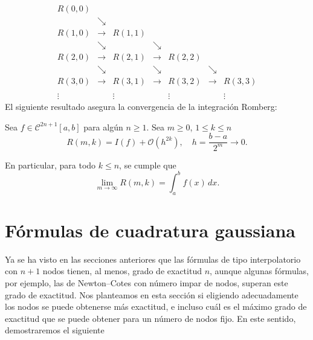 $$
\begin{array}{ccccccc}
R(0,0) &~                &        &~                &        &~                &        \\
~      & \searrow        &        &                 &        &                 &        \\
R(1,0) & \longrightarrow & R(1,1) &                 &        &                 &        \\
~      & \searrow        &        & \searrow        &        &                 &        \\
R(2,0) & \longrightarrow & R(2,1) & \longrightarrow & R(2,2) &                 &        \\
~      & \searrow        &        & \searrow        &        & \searrow        &        \\
R(3,0) & \longrightarrow & R(3,1) & \longrightarrow & R(3,2) & \longrightarrow & R(3,3) \\
~      &                 &        &                 &        &                 &        \\
\vdots &                 & \vdots &                 & \vdots &                 & \vdots
\end{array}
$$
El siguiente resultado asegura la convergencia de la integraci\'on Romberg:
\begin{thm}
Sea $f\in \mathcal{C}^{2n+1}[a,b]$ para alg\'un $n\ge 1$. Sea $m\ge 0$, $1\le k\le n$
$$R(m,k) = I(f) + \mathcal{O}(h^{2k}), \quad h=\frac{b-a}{2^m} \to 0.$$
\end{thm}
\noindent
En particular, para todo $k\le n$, se cumple que
$$\lim_{m\to \infty} R(m,k) = \int_a^b f(x) \,dx.$$


\section{F\'ormulas de cuadratura gaussiana}

Ya se ha visto en las secciones anteriores que las f\'ormulas de tipo interpolatorio con $n+1$ nodos tienen, al menos, grado de exactitud $n$, aunque algunas f\'ormulas, por ejemplo, las de Newton--Cotes con n\'umero impar de nodos, superan este grado de exactitud. Nos planteamos en esta secci\'on si eligiendo adecuadamente los nodos se puede obtenerse m\'as exactitud, e incluso cu\'al es el m\'aximo grado de exactitud que se puede obtener para un 
n\'umero de nodos fijo. En este sentido, demostraremos el siguiente 


